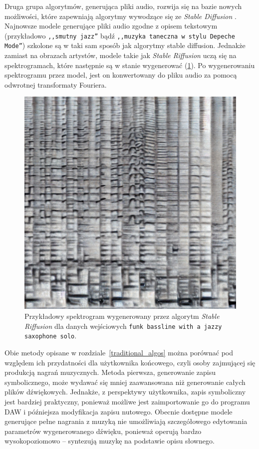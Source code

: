 Druga grupa algorytmów, generująca pliki audio, rozwija się na bazie nowych możliwości,
które zapewniają algorytmy wywodzące się ze \textit{Stable Diffusion} \cite{stablediffusion}.
Najnowsze modele generujące pliki audio zgodne z opisem tekstowym 
(przykładowo   \texttt{,,smutny jazz''} bądź \texttt{,,muzyka taneczna w stylu Depeche Mode''})
szkolone są w taki sam sposób jak algorytmy stable diffusion. 
Jednakże zamiast na obrazach artystów, modele takie jak \textit{Stable Riffusion} \cite{riffusion} 
uczą się na spektrogramach, które następnie są w stanie wygenerować (\ref{fig:riffusion_spectro}).
Po wygenerowaniu spektrogramu przez model,
jest on konwertowany do pliku audio za pomocą odwrotnej transformaty Fouriera.

\begin{figure}[H]
    \centering
    \includegraphics[width=0.4\linewidth]{rys01/riffusion_spectro.jpg}
    \caption{Przykładowy spektrogram wygenerowany przez algorytm \textit{Stable Riffusion} dla danych wejściowych \texttt{funk bassline with a jazzy saxophone solo}.}
    \label{fig:riffusion_spectro}
\end{figure}


Obie metody opisane w rozdziale~\ref{traditional_algos} można porównać pod względem ich przydatności
dla użytkownika końcowego, czyli osoby zajmującej się produkcją nagrań muzycznych. Metoda pierwsza, 
generowanie zapisu symbolicznego, może wydawać się mniej zaawansowana niż generowanie całych plików dźwiękowych.
Jednakże, z perspektywy użytkownika, zapis symboliczny jest bardziej praktyczny,
ponieważ możliwe jest zaimportowanie go do programu DAW i późniejsza modyfikacja zapisu nutowego.
Obecnie dostępne modele generujące pełne nagrania z muzyką nie umożliwiają
szczegółowego edytowania parametrów wygenerowanego dźwięku, ponieważ operują bardzo wysokopoziomowo 
-- syntezują muzykę na podstawie opisu słownego.

